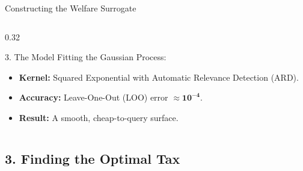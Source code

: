 \documentclass[aspectratio=1610]{beamer}
\begin{document}
\begin{frame}{Constructing the Welfare Surrogate}
\begin{columns}[t]
        \begin{column}{0.32\textwidth}
            \begin{block}{3. The Model}
                \small
                Fitting the Gaussian Process:
                \vspace{0.5em}
                \begin{itemize}
                    \item \textbf{Kernel:} Squared Exponential with Automatic Relevance Detection (ARD).
                    \item \textbf{Accuracy:} Leave-One-Out (LOO) error $\approx \mathbf{10^{-4}}$.
                    \item \textbf{Result:} A smooth, cheap-to-query surface.
                \end{itemize}
            \end{block}
        \end{column}

    \end{columns}

\end{frame}

\subsection[3. Finding the Optimal Tax]{3. Finding the Optimal Tax}
\end{document}
